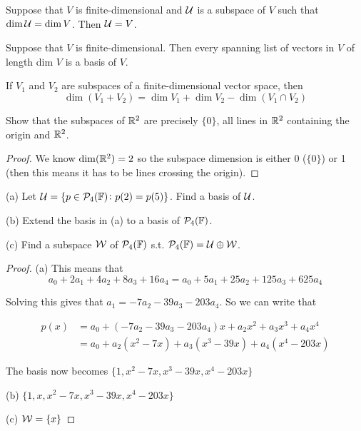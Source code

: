 \documentclass{extarticle}
\begin{document}
\begin{corollary}
    Suppose that \(V\) is finite-dimensional and \(\mathcal{U}\) is a subspace of \(V\) such that 
    \(\dim \mathcal{U} = \dim V\). Then \(\mathcal{U} = V\).
\end{corollary}

\begin{corollary}
    Suppose that \(V\) is finite-dimensional. Then every spanning list of vectors in \(V\)
    of length dim \(V\) is a basis of \(V\). 
\end{corollary}

\begin{thm}
    If \(V_1\) and \(V_2\) are subspaces of a finite-dimensional vector space, then 
    \[\dim(V_1 + V_2) = \dim V_1 + \dim V_ 2 - \dim (V_1 \cap V_2)\]
\end{thm}

\newpage 
{}


\begin{problem}{1}
    Show that the subspaces of \(\mathbb{R}^2\) are precisely \(\{0\}\), all lines in \(\mathbb{R}^2\)
    containing the origin and \(\mathbb{R}^2\).
\end{problem}

\begin{proof}
We know \(\dim (\mathbb{R}^2) = 2\) so the subspace dimension is either 0 (\(\{0\}\)) or 
1 (then this means it has to be lines crossing the origin). 
\end{proof}



\begin{problem}{5}
    (a) Let \(\mathcal{U} = \{p \in \mathcal{P}_4 (\mathbb{F}) \colon p(2) = p(5)\}\). Find a basis of \(\mathcal{U}\).

    (b) Extend the basis in (a) to a basis of \(\mathcal{P}_4 (\mathbb{F})\). 

    (c) Find a subspace \(\mathcal{W}\) of \(\mathcal{P}_4 (\mathbb{F})\) s.t. \(\mathcal{P}_4(\mathbb{F}) = \mathcal{U} \oplus \mathcal{W}\).
\end{problem}

\begin{proof}
(a)  This means that 
\[a_0 + 2a_1 + 4a_2 + 8a_3 + 16a_4 = a_0 + 5a_1 + 25a_2 + 125 a_3 + 625a_4\]

Solving this gives that \(a_1 = -7a_2 - 39a_3 - 203 a_4\). So we can write that 

\begin{align*}
    p(x)
    &= a_0 + (-7a_2 - 39a_3 - 203 a_4)x + a_2 x^2 + a_3 x^3 + a_4 x^4 \\ 
    &= a_0 + a_2(x^2 - 7x) + a_3(x^3 - 39x) + a_4 (x^4 - 203x)
\end{align*}

The basis now becomes \(\{1, x^2 - 7x, x^3 - 39x, x^4 - 203x\}\)

(b) \(\{1, x, x^2 - 7x, x^3 - 39x, x^4 - 203x\}\)

(c) \(\mathcal{W} = \{x\}\)

\end{proof}
\end{document}
